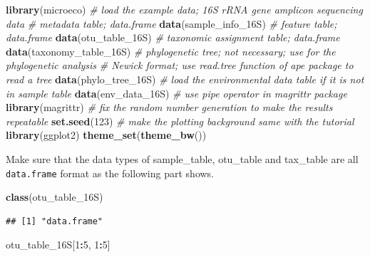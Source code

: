 \documentclass[
]{book}
\newenvironment{Shaded}{\begin{snugshade}}{\end{snugshade}}
\newcommand{\CommentTok}[1]{\textcolor[rgb]{0.56,0.35,0.01}{\textit{#1}}}
\newcommand{\DecValTok}[1]{\textcolor[rgb]{0.00,0.00,0.81}{#1}}
\newcommand{\FunctionTok}[1]{\textcolor[rgb]{0.13,0.29,0.53}{\textbf{#1}}}
\newcommand{\NormalTok}[1]{#1}
\newcommand{\SpecialCharTok}[1]{\textcolor[rgb]{0.81,0.36,0.00}{\textbf{#1}}}
\begin{document}
\begin{Shaded}
\begin{Highlighting}[]
\FunctionTok{library}\NormalTok{(microeco)}
\CommentTok{\# load the example data; 16S rRNA gene amplicon sequencing data}
\CommentTok{\# metadata table; data.frame}
\FunctionTok{data}\NormalTok{(sample\_info\_16S)}
\CommentTok{\# feature table; data.frame}
\FunctionTok{data}\NormalTok{(otu\_table\_16S)}
\CommentTok{\# taxonomic assignment table; data.frame}
\FunctionTok{data}\NormalTok{(taxonomy\_table\_16S)}
\CommentTok{\# phylogenetic tree; not necessary; use for the phylogenetic analysis}
\CommentTok{\# Newick format; use read.tree function of ape package to read a tree}
\FunctionTok{data}\NormalTok{(phylo\_tree\_16S)}
\CommentTok{\# load the environmental data table if it is not in sample table}
\FunctionTok{data}\NormalTok{(env\_data\_16S)}
\CommentTok{\# use pipe operator in magrittr package}
\FunctionTok{library}\NormalTok{(magrittr)}
\CommentTok{\# fix the random number generation to make the results repeatable}
\FunctionTok{set.seed}\NormalTok{(}\DecValTok{123}\NormalTok{)}
\CommentTok{\# make the plotting background same with the tutorial}
\FunctionTok{library}\NormalTok{(ggplot2)}
\FunctionTok{theme\_set}\NormalTok{(}\FunctionTok{theme\_bw}\NormalTok{())}
\end{Highlighting}
\end{Shaded}

Make sure that the data types of sample\_table, otu\_table and tax\_table are all \texttt{data.frame} format as the following part shows.

\begin{Shaded}
\begin{Highlighting}[]
\FunctionTok{class}\NormalTok{(otu\_table\_16S)}
\end{Highlighting}
\end{Shaded}

\begin{verbatim}
## [1] "data.frame"
\end{verbatim}

\begin{Shaded}
\begin{Highlighting}[]
\NormalTok{otu\_table\_16S[}\DecValTok{1}\SpecialCharTok{:}\DecValTok{5}\NormalTok{, }\DecValTok{1}\SpecialCharTok{:}\DecValTok{5}\NormalTok{]}
\end{Highlighting}
\end{Shaded}
\end{document}
